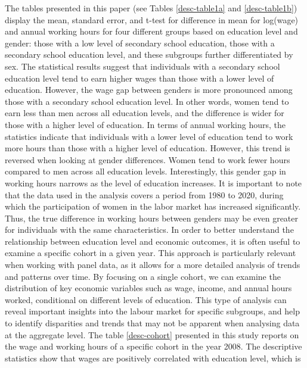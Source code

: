 \documentclass[14pt]{sistedes}
\begin{document}
The tables presented in this paper (see Tables \ref{desc-table1a} and \ref{desc-table1b}) display the mean, standard
error, and t-test for difference in mean for log(wage) and annual working hours for four different groups based on
education level and gender: those with a low level of secondary school education, those with a secondary school
education level, and these subgroups further differentiated by sex. The statistical results suggest that individuals
with a secondary school education level tend to earn higher wages than those with a lower level of education. However,
the wage gap between genders is more pronounced among those with a secondary school education level. In other words,
women tend to earn less than men across all education levels, and the difference is wider for those with a higher level
of education.
\newline
In terms of annual working hours, the statistics indicate that individuals with a lower level of education tend to work
more hours than those with a higher level of education. However, this trend is reversed when looking at gender
differences. Women tend to work fewer hours compared to men across all education levels. Interestingly, this gender gap
in working hours narrows as the level of education increases. It is important to note that the data used in the analysis
covers a period from 1980 to 2020, during which the participation of women in the labor market has increased
significantly. Thus, the true difference in working hours between genders may be even greater for individuals with the
same characteristics.\newline
In order to better understand the relationship between education level and economic outcomes, it is often useful to
examine a specific cohort in a given year. This approach is particularly relevant when working with panel data, as it
allows for a more detailed analysis of trends and patterns over time. By focusing on a single cohort, we can examine the
distribution of key economic variables such as wage, income, and annual hours worked, conditional on different levels of
education. This type of analysis can reveal important insights into the labour market for specific subgroups, and help
to identify disparities and trends that may not be apparent when analysing data at the aggregate level.
\newline
The table \ref{desc-cohort} presented in this study reports on the wage and working hours of a specific cohort in the
year 2008. The descriptive statistics show that wages are positively correlated with education level, which is
\end{document}
